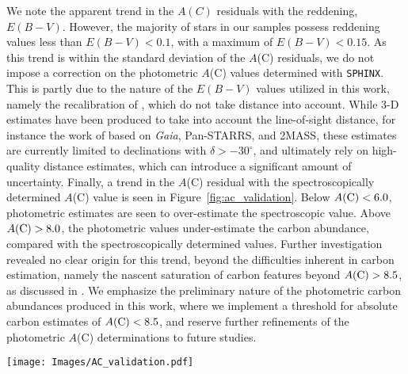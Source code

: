\documentclass[twocolumn,trackchanges]{aastex63}
\begin{document}
We note the apparent trend in the $A(C)$ residuals with the reddening, $E(B-V)$. However, the majority of stars in our samples possess reddening values less than $E(B-V) < 0.1$, with a maximum of $E(B-V) <0.15$. As this trend is within the standard deviation of the $A$(C) residuals, we do not impose a correction on the photometric $A$(C) values determined with \texttt{SPHINX}. This is partly due to the nature of the $E(B-V)$ values utilized in this work, namely the \citet{Schlafly:2011} recalibration of \citet{Schlegel:1998}, which do not take distance into account. While 3-D estimates have been produced to take into account the line-of-sight distance, for instance the work of \citet{Green:2019} based on {\em Gaia}, Pan-STARRS, and 2MASS, these estimates are currently limited to declinations with $\delta >-30^{\circ}$, and ultimately rely on high-quality distance estimates, which can introduce a significant amount of uncertainty.
Finally, a trend in the $A$(C) residual with the spectroscopically determined $A$(C) value is seen in Figure~\ref{fig:ac_validation}. Below $A({\rm C})<6.0$, photometric estimates are seen to over-estimate the spectroscopic value. Above $A({\rm C}) > 8.0$, the photometric values under-estimate the carbon abundance, compared with the spectroscopically determined values. Further investigation revealed no clear origin for this trend, beyond the difficulties inherent in carbon estimation, namely the nascent saturation of carbon features beyond $A({\rm C}) > 8.5$, as discussed in \citet{Yoon:2020}. We emphasize the preliminary nature of the photometric carbon abundances produced in this work, where we implement a threshold for absolute carbon estimates of $A({\rm C}) < 8.5$, and reserve further refinements of the photometric $A$(C) determinations to future studies.


\begin{figure*}
	\centering

	\texttt{[image: Images/AC\_validation.pdf]}
	\caption{$A$(C) residual trends in validation samples with \texttt{SPHINX}. The difference between the \texttt{SPHINX} photometric $A$(C) estimate and the spectrscopically determined values are shown plotted against the $g$ magnitude (top left panel), the spectroscopic $A$(C) value (top right panel), the reddening, $E(B-V)$ (bottom left panel), and the photometric effective-temperature estimate (bottom right panel). Trend-lines (green panel) are determined via locally weighted regression. \label{fig:ac_validation}}
\end{figure*}
\end{document}
